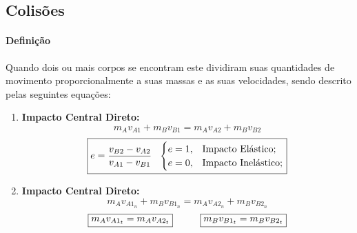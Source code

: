 \documentclass{article}
\begin{document}
        \subsection{Colisões}
            \paragraph{Definição}Quando dois ou mais corpos se encontram este dividiram suas quantidades de movimento proporcionalmente a suas massas e as suas velocidades, sendo descrito pelas seguintes equações:
                \begin{enumerate}[noitemsep]
                    \item \textbf{Impacto Central Direto:}
                        \begin{equation}
                            \boxed{
                                m_{A}v_{A1} + m_{B}v_{B1} = m_{A}v_{A2} + m_{B}v_{B2}
                            }
                        \end{equation}
                        \begin{equation}
                            \boxed{
                                e = \frac{v_{B2} - v_{A2}}{v_{A1} - v_{B1}}
                                \hspace{2.5mm}
                                \begin{cases}
                                    e = 1, & \text{Impacto Elástico};\\
                                    e = 0, & \text{Impacto Inelástico};\\
                                \end{cases}
                            }
                        \end{equation}
                    \item \textbf{Impacto Central Direto:}
                        \begin{equation}
                            \boxed{
                                m_{A}v_{A1_{n}} + m_{B}v_{B1_{n}} = m_{A}v_{A2_{n}} + m_{B}v_{B2_{n}}
                            }
                        \end{equation}
                        \begin{equation}
                            \boxed{m_{A}v_{A1_{t}} = m_{A}v_{A2_{t}}}
                            \hspace{10mm}
                            \boxed{m_{B}v_{B1_{t}} = m_{B}v_{B2_{t}}}
                        \end{equation}

\end{enumerate}
\end{document}
